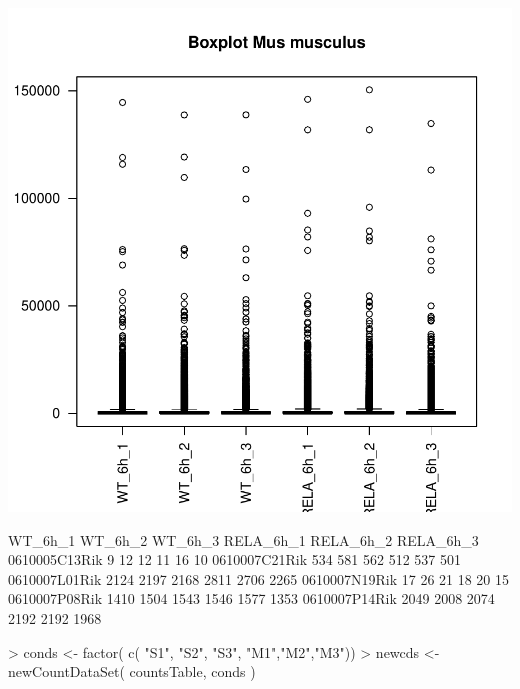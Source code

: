 \documentclass{article}
\begin{document}
\includegraphics{JuanHenao_Taller3A-002}
\begin{Schunk}
\begin{Soutput}
              WT_6h_1 WT_6h_2 WT_6h_3 RELA_6h_1 RELA_6h_2 RELA_6h_3
0610005C13Rik       9      12      12        11        16        10
0610007C21Rik     534     581     562       512       537       501
0610007L01Rik    2124    2197    2168      2811      2706      2265
0610007N19Rik      17      26      21        18        20        15
0610007P08Rik    1410    1504    1543      1546      1577      1353
0610007P14Rik    2049    2008    2074      2192      2192      1968
\end{Soutput}
\begin{Sinput}
> conds <- factor( c( "S1", "S2", "S3", "M1","M2","M3"))
> newcds <- newCountDataSet( countsTable, conds )
\end{Sinput}
\end{Schunk}
\end{document}

